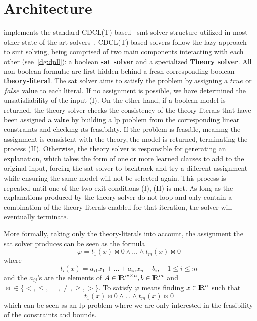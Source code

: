 \documentclass[runningheads]{llncs}
\begin{document}
\section{Architecture}
\label{sec:architecture}

\dlinear implements the standard CDCL(T)-based~\cite{ref:dpll-t} \gls{smt} solver structure utilized in most other state-of-the-art solvers~\cite{ref:cvc5}.
CDCL(T)-based solvers follow the lazy approach to \gls{smt} solving, being comprised of two main components interacting with each other (see~\autoref{dg:dpll}): a boolean \textbf{\gls{sat} solver} and a specialized \textbf{Theory solver}.
All non-boolean formulae are first hidden behind a fresh corresponding boolean \textbf{theory-literal}.
The \gls{sat} solver aims to satisfy the problem by assigning a $true$ or $false$ value to each literal.
If no assignment is possible, we have determined the unsatisfiability of the input (I).
On the other hand, if a boolean model is returned, the theory solver checks the consistency of the theory-literals that have been assigned a value by building a \gls{lp} problem from the corresponding linear constraints and checking its feasibility.
If the problem is feasible, meaning the assignment is consistent with the theory, the model is returned, terminating the process (II).
Otherwise, the theory solver is responsible for generating an explanation, which takes the form of one or more learned clauses to add to the original input, forcing the \gls{sat} solver to backtrack and try a different assignment while ensuring the same model will not be selected again.
This process is repeated until one of the two exit conditions (I), (II) is met.
As long as the explanations produced by the theory solver do not loop and only contain a combination of the theory-literals enabled for that iteration, the solver will eventually terminate.


More formally, taking only the theory-literals into account, the assignment the \gls{sat} solver produces can be seen as the formula
\begin{equation} %
    \label{eq:smt-formula}
    \varphi = t_1(x) \bowtie 0 \wedge \ldots \wedge t_m (x) \bowtie 0
\end{equation}
where
\begin{equation*}
    t_i(x) = a_{i1}x_1 + \ldots + a_{in}x_n - b_i, \quad 1 \le i \le m
\end{equation*}
and the $a_{ij}$'s are the elements of $A \in {\rm I\!R}^{m \times n}, b \in {\rm I\!R}^m$ and $\bowtie \in \{<, \le, =, \ne, \ge, >\}$.
To satisfy $\varphi$ means finding $x \in {\rm I\!R}^n $ such that
\begin{equation*}
    t_1(x) \bowtie 0 \wedge \ldots \wedge t_m(x) \bowtie 0
\end{equation*}
which can be seen as an \gls{lp} problem where we are only interested in the feasibility of the constraints and bounds.
\end{document}

